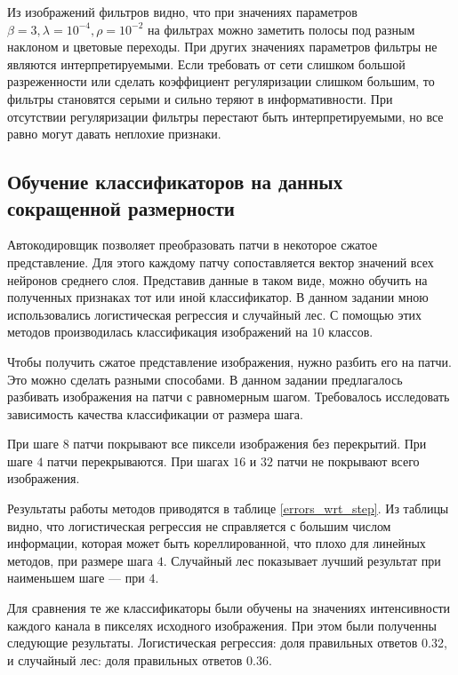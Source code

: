 \documentclass[12pt]{article}
\begin{document}
		Из изображений фильтров видно, что при значениях параметров $\beta = 3, \lambda = 10^{-4}, \rho = 10^{-2}$ на фильтрах можно заметить полосы под разным наклоном и цветовые переходы. При других значениях параметров фильтры не являются интерпретируемыми. Если требовать от сети слишком большой разреженности или сделать коэффициент регуляризации слишком большим, то фильтры становятся серыми и сильно теряют в информативности. При отсутствии регуляризации фильтры перестают быть интерпретируемыми, но все равно могут давать неплохие признаки.

	\subsection{Обучение классификаторов на данных сокращенной размерности}
		\hspace{0.6cm}Автокодировщик позволяет преобразовать патчи в некоторое сжатое представление. Для этого каждому патчу сопоставляется вектор значений всех нейронов среднего слоя. Представив данные в таком виде, можно обучить на полученных признаках тот или иной классификатор. В данном задании мною использовались логистическая регрессия и случайный лес. С помощью этих методов производилась классификация изображений на $10$ классов.

		Чтобы получить сжатое представление изображения, нужно разбить его на патчи. Это можно сделать разными способами. В данном задании предлагалось разбивать изображения на патчи с равномерным шагом. Требовалось исследовать зависимость качества классификации от размера шага.

		При шаге $8$ патчи покрывают все пиксели изображения без перекрытий. При шаге $4$ патчи перекрываются. При шагах $16$ и $32$ патчи не покрывают всего изображения.

		Результаты работы методов приводятся в таблице \ref{errors_wrt_step}. Из таблицы видно, что логистическая регрессия не справляется с большим числом информации, которая может быть кореллированной, что плохо для линейных методов, при размере шага $4$. Случайный лес показывает лучший результат при наименьшем шаге — при $4$.

		Для сравнения те же классификаторы были обучены на значениях интенсивности каждого канала в пикселях исходного изображения. При этом были полученны следующие результаты. Логистическая регрессия: доля правильных ответов 0.32, и случайный лес: доля правильных ответов 0.36.
\end{document}
